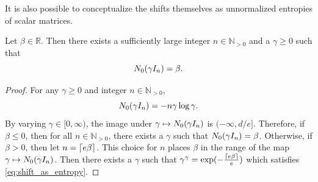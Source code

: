 \documentclass[notitlepage, 10pt]{article}
\begin{document}
It is also possible to conceptualize the shifts themselves as unnormalized entropies of scalar matrices.
\begin{prop}
    Let $\beta \in \mathbb R$. 
    Then there exists a sufficiently large integer $n \in \mathbb N_{> 0}$ and a $\gamma \geq 0$ such that
    \begin{equation}
        \label{eq:shift_as_entropy}
        N_0(\gamma I_n) = \beta.
    \end{equation}
\end{prop}
\begin{proof}
    For any $\gamma \geq 0$ and integer $n \in \mathbb N_{> 0}$,
    \begin{equation}
        N_0(\gamma I_n) = - n \gamma \log \gamma.
    \end{equation}
    By varying $\gamma \in [0,\infty)$, the image under $\gamma \mapsto N_0(\gamma I_n)$ is $(-\infty, d/e]$.
    Therefore, if $\beta \leq 0$, then for all $n \in \mathbb N_{>0}$, there exists a $\gamma$ such that $N_0(\gamma I_n) = \beta$.
    Otherwise, if $\beta > 0$, then let $n = \left\lceil e \beta\right\rceil$. 
    This choice for $n$ places $\beta$ in the range of the map $\gamma \mapsto N_0(\gamma I_n)$.
    Then there exists a $\gamma$ such that $\gamma^{\gamma} = \exp(-\frac{\left\lceil e \beta\right\rceil}{e})$ which satisfies \cref{eq:shift_as_entropy}.
\end{proof}
\end{document}

